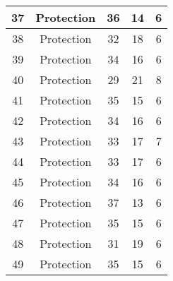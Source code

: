 \documentclass[results.tex]{subfiles}
\begin{document}
\begin{center}
\begin{tabular}{| c || c | c | c | c |}
            \hline
            37                      & Protection                   & 36                     & 14                      & 6                    \\
            \hline
            38                      & Protection                   & 32                     & 18                      & 6                    \\
            \hline
            39                      & Protection                   & 34                     & 16                      & 6                    \\
            \hline
            40                      & Protection                   & 29                     & 21                      & 8                    \\
            \hline
            41                      & Protection                   & 35                     & 15                      & 6                    \\
            \hline
            42                      & Protection                   & 34                     & 16                      & 6                    \\
            \hline
            43                      & Protection                   & 33                     & 17                      & 7                    \\
            \hline
            44                      & Protection                   & 33                     & 17                      & 6                    \\
            \hline
            45                      & Protection                   & 34                     & 16                      & 6                    \\
            \hline
            46                      & Protection                   & 37                     & 13                      & 6                    \\
            \hline
            47                      & Protection                   & 35                     & 15                      & 6                    \\
            \hline
            48                      & Protection                   & 31                     & 19                      & 6                    \\
            \hline
            49                      & Protection                   & 35                     & 15                      & 6                    \\
            \hline
        \end{tabular}
    \end{center}
\end{document}
